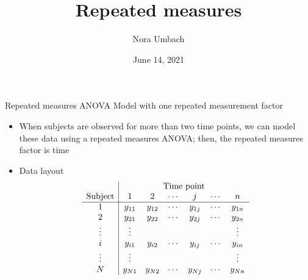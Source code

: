 \documentclass{beamer}
\title{Repeated measures}
\author{Nora Umbach%
}
\date{June 14, 2021}
\begin{document}
\begin{frame}{}
\thispagestyle{empty}
\titlepage
\end{frame}


\begin{frame}{Repeated measures ANOVA}
  {Model with one repeated measurement factor}
  \begin{itemize}
    \item When subjects are observed for more than two time points, we can
      model these data using a repeated measures ANOVA; then, the repeated
      measures factor is time
    \item Data layout
\[ \begin{array}{c|cccccc}
              & \multicolumn{6}{c}{\text{Time point}} \\
\text{Subject} & 1 & 2 & \cdots & j & \cdots & n \\ \hline
1      & y_{11} & y_{12} & \cdots & y_{1j} & \cdots & y_{1n} \\
2      & y_{21} & y_{22} & \cdots & y_{2j} & \cdots & y_{2n} \\
\vdots & \vdots &        &        &        &        & \vdots \\
i      & y_{i1} & y_{i2} & \cdots & y_{ij} & \cdots & y_{in} \\
\vdots & \vdots &        &        &        &        & \vdots \\
N      & y_{N1} & y_{N2} & \cdots & y_{Nj} & \cdots & y_{Nn} \\
\end{array} \]
  \end{itemize}
\end{frame}
\end{document}
